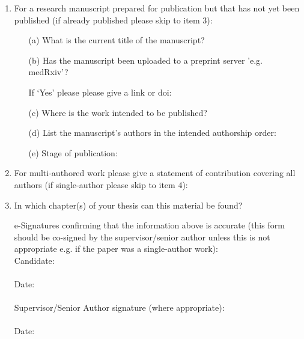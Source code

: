 \begin{enumerate}
    \item For a research manuscript prepared for publication but that has not yet been published (if already published please skip to item 3):\\
    \begin{enumerate}
        \item[(a)] What is the current title of the manuscript?\\
        \TextField{}
        \item[(b)] Has the manuscript been uploaded to a preprint server ’e.g. medRxiv’?\\
        \CheckBox{}
        \item[] If ‘Yes’ please please give a link or doi:\\
        \TextField{}
        \item[(c)] Where is the work intended to be published?\\
        \TextField{}
        \item[(d)] List the manuscript’s authors in the intended authorship order:\\
        \TextField{}
        \item[(e)] Stage of publication:\\
        \TextField{}
    \end{enumerate}

    \item For multi-authored work please give a statement of contribution covering all authors (if single-author please skip to item 4):\\
    \TextField[multiline=true,width=\linewidth,height=3cm]{}

    \item In which chapter(s) of your thesis can this material be found?
    \TextField{}

    e-Signatures confirming that the information above is accurate (this form should be co-signed by the supervisor/senior author unless this is not appropriate e.g. if the paper was a single-author work):\\
    \noindent Candidate:\\
    \TextField{}\\
    Date:\\
    \TextField{}\\
    Supervisor/Senior Author signature (where appropriate):\\
    \TextField{}\\
    Date:\\
    \TextField{}
\end{enumerate}

